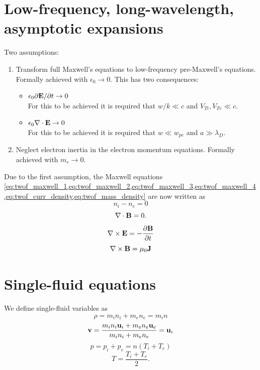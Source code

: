 \documentclass[a4paper,11pt]{report}
\begin{document}
\section{Low-frequency, long-wavelength, asymptotic expansions}
Two assumptions:
\begin{enumerate}
\item Transform full Maxwell's equations to low-frequency pre-Maxwell's equations. Formally achieved with $\epsilon_0 \to 0$. This has two consequences:
\begin{itemize}
\item $\epsilon_0 \partial \mathbf{E} / \partial t \to 0$ \\
For this to be achieved it is required that $w/k \ll c$ and $V_{Ti}, V_{Te} \ll c$.
\item $\epsilon_0 \nabla \cdot \mathbf{E} \to 0$\\
For this to be achieved it is required that $w \ll w_{pe}$ and $a \gg \lambda_{D}$.
\end{itemize}
\item Neglect electron inertia in the electron momentum equations. Formally achieved with $m_e \to 0$.
\end{enumerate}

Due to the first assumption, the Maxwell equations \cref{eq:twof_maxwell_1,eq:twof_maxwell_2,eq:twof_maxwell_3,eq:twof_maxwell_4,eq:twof_curr_density,eq:twof_mass_density} are now written as
\begin{equation}
\label{eq:preMax_gauss}
n_i - n_e = 0
\end{equation}
\begin{equation}
\label{eq:preMax_Bdiv}
\nabla \cdot \mathbf{B} = 0.
\end{equation}
\begin{equation}
\label{eq:preMax_faradays}
\nabla \times \mathbf{E} = -\frac{ \partial \mathbf{B}}{\partial t}
\end{equation}
\begin{equation}
\label{eq:preMax_amperes}
\nabla \times \mathbf{B} = \mu_0 \mathbf{J} 
\end{equation}

\section{Single-fluid equations}
We define single-fluid variables as
\begin{equation}
    \rho = m_i n_i + m_e n_e = m_i n
\end{equation}
\begin{equation}
    \mathbf{v} = \frac{m_i n_i \mathbf{u}_i + m_e n_e \mathbf{u}_e}{m_i n_i + m_e n_e} = \mathbf{u}_i
\end{equation}
\begin{equation}
    p = p_i + p_e = n (T_i + T_e)
\end{equation}
\begin{equation}
    T = \frac{T_i + T_e}{2}.
\end{equation}
\end{document}
